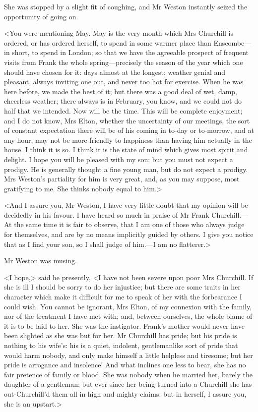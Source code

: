 She was stopped by a slight fit of coughing, and Mr Weston instantly seized the opportunity of going on.

<You were mentioning May. May is the very month which Mrs Churchill is ordered, or has ordered herself, to spend in some warmer place than Enscombe—in short, to spend in London; so that we have the agreeable prospect of frequent visits from Frank the whole spring—precisely the season of the year which one should have chosen for it: days almost at the longest; weather genial and pleasant, always inviting one out, and never too hot for exercise. When he was here before, we made the best of it; but there was a good deal of wet, damp, cheerless weather; there always is in February, you know, and we could not do half that we intended. Now will be the time. This will be complete enjoyment; and I do not know, Mrs Elton, whether the uncertainty of our meetings, the sort of constant expectation there will be of his coming in to-day or to-morrow, and at any hour, may not be more friendly to happiness than having him actually in the house. I think it is so. I think it is the state of mind which gives most spirit and delight. I hope you will be pleased with my son; but you must not expect a prodigy. He is generally thought a fine young man, but do not expect a prodigy. Mrs Weston's partiality for him is very great, and, as you may suppose, most gratifying to me. She thinks nobody equal to him.>

<And I assure you, Mr Weston, I have very little doubt that my opinion will be decidedly in his favour. I have heard so much in praise of Mr Frank Churchill.—At the same time it is fair to observe, that I am one of those who always judge for themselves, and are by no means implicitly guided by others. I give you notice that as I find your son, so I shall judge of him.—I am no flatterer.>

Mr Weston was musing.

<I hope,> said he presently, <I have not been severe upon poor Mrs Churchill. If she is ill I should be sorry to do her injustice; but there are some traits in her character which make it difficult for me to speak of her with the forbearance I could wish. You cannot be ignorant, Mrs Elton, of my connexion with the family, nor of the treatment I have met with; and, between ourselves, the whole blame of it is to be laid to her. She was the instigator. Frank's mother would never have been slighted as she was but for her. Mr Churchill has pride; but his pride is nothing to his wife's: his is a quiet, indolent, gentlemanlike sort of pride that would harm nobody, and only make himself a little helpless and tiresome; but her pride is arrogance and insolence! And what inclines one less to bear, she has no fair pretence of family or blood. She was nobody when he married her, barely the daughter of a gentleman; but ever since her being turned into a Churchill she has out-Churchill'd them all in high and mighty claims: but in herself, I assure you, she is an upstart.>

